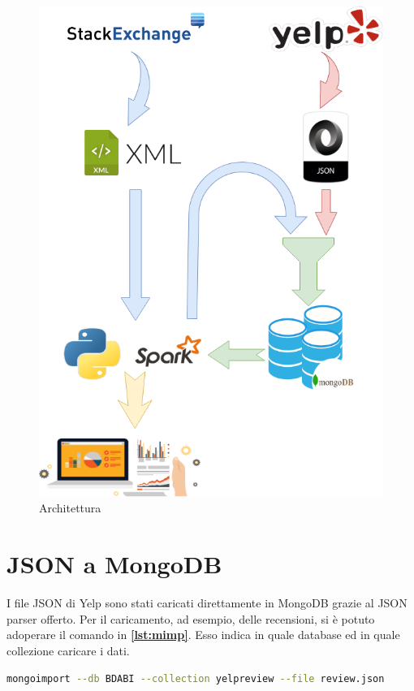 \begin{figure}[H]
	\centering
	\includegraphics[scale=0.5]{image/BDABI.png}
	\caption{Architettura}
	\label{fig:arc}
\end{figure}
\section{JSON a MongoDB}
I file JSON di Yelp sono stati caricati direttamente in MongoDB grazie al JSON parser offerto.
Per il caricamento, ad esempio, delle recensioni, si è potuto adoperare il comando in \textbf{\ref{lst:mimp}}. Esso indica in quale database ed in quale collezione caricare i dati.\par

\begin{lstlisting}[language=Bash, caption={Yelp Dataset Loading}, captionpos=b, label={lst:mimp}]
mongoimport --db BDABI --collection yelpreview --file review.json
\end{lstlisting}

